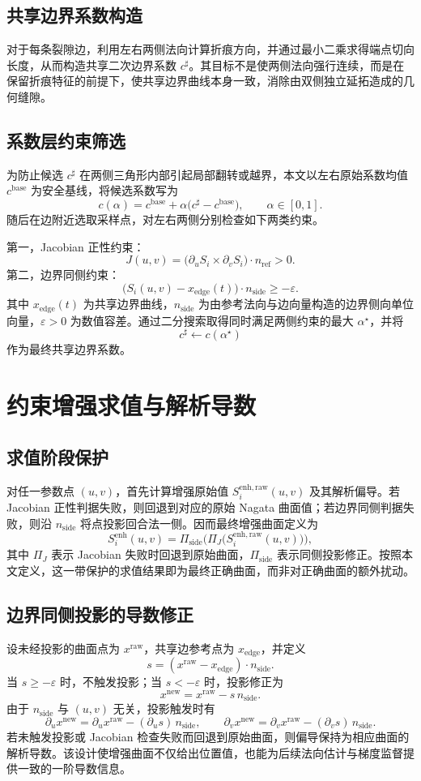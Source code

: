 \documentclass[12pt,oneside]{ctexbook}
\begin{document}
\subsection{共享边界系数构造}
对于每条裂隙边，利用左右两侧法向计算折痕方向，并通过最小二乘求得端点切向长度，从而构造共享二次边界系数 $c^{\sharp}$。其目标不是使两侧法向强行连续，而是在保留折痕特征的前提下，使共享边界曲线本身一致，消除由双侧独立延拓造成的几何缝隙。

\subsection{系数层约束筛选}
为防止候选 $c^{\sharp}$ 在两侧三角形内部引起局部翻转或越界，本文以左右原始系数均值 $c^{\mathrm{base}}$ 为安全基线，将候选系数写为
\[
c(\alpha)=c^{\mathrm{base}}+\alpha\big(c^{\sharp}-c^{\mathrm{base}}\big),\qquad \alpha\in[0,1].
\]
随后在边附近选取采样点，对左右两侧分别检查如下两类约束。

第一，Jacobian 正性约束：
\[
J(u,v)=\big(\partial_u S_i\times \partial_v S_i\big)\cdot n_{\mathrm{ref}}>0.
\]
第二，边界同侧约束：
\[
\big(S_i(u,v)-x_{\mathrm{edge}}(t)\big)\cdot n_{\mathrm{side}}\ge -\varepsilon.
\]
其中 $x_{\mathrm{edge}}(t)$ 为共享边界曲线，$n_{\mathrm{side}}$ 为由参考法向与边向量构造的边界侧向单位向量，$\varepsilon>0$ 为数值容差。通过二分搜索取得同时满足两侧约束的最大 $\alpha^\star$，并将
\[
c^{\sharp}\leftarrow c(\alpha^\star)
\]
作为最终共享边界系数。

\section{约束增强求值与解析导数}
\subsection{求值阶段保护}
对任一参数点 $(u,v)$，首先计算增强原始值 $S_i^{\mathrm{enh,raw}}(u,v)$ 及其解析偏导。若 Jacobian 正性判据失败，则回退到对应的原始 Nagata 曲面值；若边界同侧判据失败，则沿 $n_{\mathrm{side}}$ 将点投影回合法一侧。因而最终增强曲面定义为
\[
S_i^{\mathrm{enh}}(u,v)=\Pi_{\mathrm{side}}\Big(\Pi_{J}\big(S_i^{\mathrm{enh,raw}}(u,v)\big)\Big),
\]
其中 $\Pi_J$ 表示 Jacobian 失败时回退到原始曲面，$\Pi_{\mathrm{side}}$ 表示同侧投影修正。按照本文定义，这一带保护的求值结果即为最终正确曲面，而非对正确曲面的额外扰动。

\subsection{边界同侧投影的导数修正}
设未经投影的曲面点为 $x^{\mathrm{raw}}$，共享边参考点为 $x_{\mathrm{edge}}$，并定义
\[
s=(x^{\mathrm{raw}}-x_{\mathrm{edge}})\cdot n_{\mathrm{side}}.
\]
当 $s\ge -\varepsilon$ 时，不触发投影；当 $s< -\varepsilon$ 时，投影修正为
\[
x^{\mathrm{new}}=x^{\mathrm{raw}}-s\,n_{\mathrm{side}}.
\]
由于 $n_{\mathrm{side}}$ 与 $(u,v)$ 无关，投影触发时有
\[
\partial_u x^{\mathrm{new}}=\partial_u x^{\mathrm{raw}}-(\partial_u s)\,n_{\mathrm{side}},
\qquad
\partial_v x^{\mathrm{new}}=\partial_v x^{\mathrm{raw}}-(\partial_v s)\,n_{\mathrm{side}}.
\]
若未触发投影或 Jacobian 检查失败而回退到原始曲面，则偏导保持为相应曲面的解析导数。该设计使增强曲面不仅给出位置值，也能为后续法向估计与梯度监督提供一致的一阶导数信息。
\end{document}
